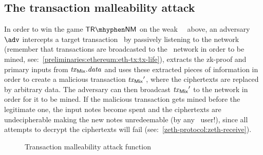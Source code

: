 \subsection{The transaction malleability attack}

In order to win the game $\trnm$ on the weak \zeth~\dapscheme~above, an adversary $\adv$ intercepts a target transaction \zethTx~by passively listening to the network (remember that transactions are broadcasted to the \ethereum~network in order to be mined, see:~\cref{preliminaries:ethereum:eth-tx:tx-life}), extracts the zk-proof and primary inputs from $\mathit{\mathit{tx}_{\mathsf{Mix}}}.\mathit{data}$ and uses these extracted pieces of information in order to create a malicious transaction $\mathit{\mathit{tx}_{\mathsf{Mix}}}'$, where the ciphertexts are replaced by arbitrary data.
The adversary can then broadcast $\mathit{\mathit{tx}_{\mathsf{Mix}}}'$ to the network in order for it to be mined. If the malicious transaction gets mined before the legitimate one, the input notes become spent and the ciphertexts are undecipherable making the new notes unredeemable (by any \zeth~user!), since all attempts to decrypt the ciphertexts will fail (see:~\cref{zeth-protocol:zeth-receive}).

\begin{figure}[H]
    \centering
    \caption{Transaction malleability attack function \txmalgen}\label{appendix:trnm:fig:txmalgen}
\end{figure}

